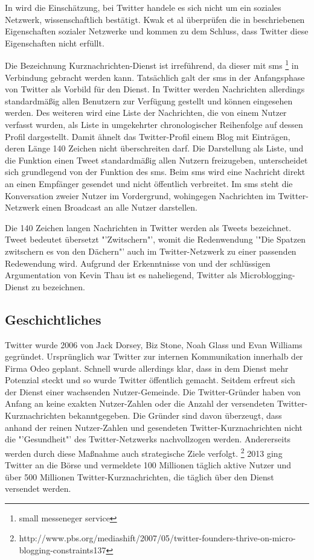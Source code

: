 			In \cite{Kwak2010} wird die Einschätzung, bei Twitter handele es sich nicht um ein soziales Netzwerk, wissenschaftlich bestätigt.
			Kwak et al überprüfen die in \cite{Newman2003} beschriebenen Eigenschaften sozialer Netzwerke und kommen zu dem Schluss, dass Twitter diese Eigenschaften nicht erfüllt.	

			Die Bezeichnung Kurznachrichten-Dienst ist irreführend, da dieser mit sms \footnote{small messeneger service} in Verbindung gebracht werden kann. 
			Tatsächlich galt der sms in der Anfangsphase von Twitter als Vorbild für den Dienst.
			In Twitter werden Nachrichten allerdings standardmäßig allen Benutzern zur Verfügung gestellt und können eingesehen werden. 
			Des weiteren wird eine Liste der Nachrichten, die von einem Nutzer verfasst wurden, als Liste in umgekehrter chronologischer Reihenfolge auf dessen Profil dargestellt.
			Damit ähnelt das Twitter-Profil einem Blog mit Einträgen, deren Länge 140 Zeichen nicht überschreiten darf. 
			Die Darstellung als Liste, und die Funktion einen Tweet standardmäßig allen Nutzern freizugeben, unterscheidet sich grundlegend von der Funktion des sms.
			Beim sms wird eine Nachricht direkt an einen Empfänger gesendet und nicht öffentlich verbreitet.
			Im sms steht die Konversation zweier Nutzer im Vordergrund, wohingegen Nachrichten im Twitter-Netzwerk einen Broadcast an alle Nutzer darstellen.

			Die 140 Zeichen langen Nachrichten in Twitter werden als Tweets bezeichnet.
			Tweet bedeutet übersetzt "'Zwitschern"', womit die Redenwendung '"Die Spatzen zwitschern es von den Dächern"' auch im Twitter-Netzwerk zu einer passenden Redewendung wird.  
			Aufgrund der Erkenntnisse von \cite{Kwak2010} und der schlüssigen Argumentation von Kevin Thau ist es naheliegend, Twitter als Microblogging-Dienst zu bezeichnen.

		\subsection{Geschichtliches}
			
			Twitter wurde 2006 von Jack Dorsey, Biz Stone, Noah Glass und Evan Williams gegründet.
			Ursprünglich war Twitter zur internen Kommunikation innerhalb der Firma Odeo geplant.
			Schnell wurde allerdings klar, dass in dem Dienst mehr Potenzial steckt und so wurde Twitter öffentlich gemacht.
			Seitdem erfreut sich der Dienst einer wachsenden Nutzer-Gemeinde.
			Die Twitter-Gründer haben von Anfang an keine exakten Nutzer-Zahlen oder die Anzahl der versendeten Twitter-Kurznachrichten bekanntgegeben.
			Die Gründer sind davon überzeugt, dass anhand der reinen Nutzer-Zahlen und gesendeten Twitter-Kurznachrichten nicht die "'Gesundheit"' des Twitter-Netzwerks nachvollzogen werden.
			Andererseits werden durch diese Maßnahme auch strategische Ziele verfolgt.  \footnote{http://www.pbs.org/mediashift/2007/05/twitter-founders-thrive-on-micro-blogging-constraints137}
			2013 ging Twitter an die Börse und vermeldete 100 Millionen täglich aktive Nutzer und über 500 Millionen Twitter-Kurznachrichten, die täglich über den Dienst versendet werden. 

